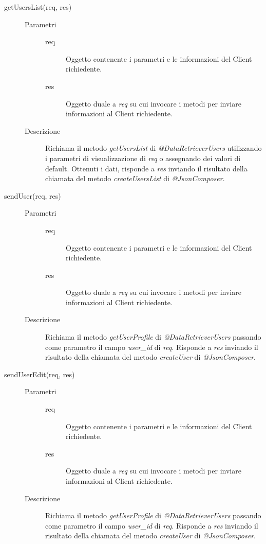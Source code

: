 \begin{description}
\begin{description}
    \item[getUsersList(req, res)] \hfill
      \begin{description}
	\item[Parametri] \hfill
	  \begin{description}
	    \item[req]
	    Oggetto contenente i parametri e le informazioni del Client richiedente.
	    \item[res]
	    Oggetto duale a \textit{req} su cui invocare i metodi per inviare informazioni al Client richiedente.
	  \end{description}
	\item[Descrizione]
	Richiama il metodo \textit{getUsersList} di \textit{@DataRetrieverUsers} utilizzando i parametri di visualizzazione 
	di \textit{req} o assegnando dei valori di default. Ottenuti i dati, risponde a \textit{res} inviando il risultato 
	della chiamata del metodo \textit{createUsersList} di \textit{@JsonComposer}.
      \end{description}
      
    \item[sendUser(req, res)] \hfill
      \begin{description}
	\item[Parametri] \hfill
	  \begin{description}
	    \item[req]
	    Oggetto contenente i parametri e le informazioni del Client richiedente.
	    \item[res]
	    Oggetto duale a \textit{req} su cui invocare i metodi per inviare informazioni al Client richiedente.
	  \end{description}
	\item[Descrizione]
	Richiama il metodo \textit{getUserProfile} di \textit{@DataRetrieverUsers} passando come parametro 
	il campo \textit{user\_id} di \textit{req}. Risponde a \textit{res} inviando il risultato 
	della chiamata del metodo \textit{createUser} di \textit{@JsonComposer}.
      \end{description}
      
    \item[sendUserEdit(req, res)] \hfill
      \begin{description}
	\item[Parametri] \hfill
	  \begin{description}
	    \item[req]
	    Oggetto contenente i parametri e le informazioni del Client richiedente.
	    \item[res]
	    Oggetto duale a \textit{req} su cui invocare i metodi per inviare informazioni al Client richiedente.
	  \end{description}
	\item[Descrizione]
	Richiama il metodo \textit{getUserProfile} di \textit{@DataRetrieverUsers} passando come parametro 
	il campo \textit{user\_id} di \textit{req}. Risponde a \textit{res} inviando il risultato 
	della chiamata del metodo \textit{createUser} di \textit{@JsonComposer}.
      \end{description}
	

\end{description}
\end{description}
